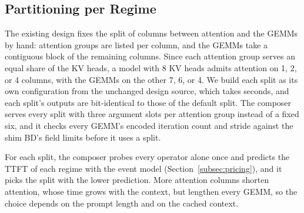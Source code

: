 \subsection{Partitioning per Regime}
\label{subsec:split}

The existing design fixes the split of columns between attention and the GEMMs by hand: attention groups are listed per column, and the GEMMs take a contiguous block of the remaining columns.
Since each attention group serves an equal share of the KV heads, a model with 8 KV heads admits attention on 1, 2, or 4 columns, with the GEMMs on the other 7, 6, or 4.
We build each split as its own configuration from the unchanged design source, which takes seconds, and each split's outputs are bit-identical to those of the default split.
The composer serves every split with three argument slots per attention group instead of a fixed six, and it checks every GEMM's encoded iteration count and stride against the shim BD's field limits before it uses a split.

For each split, the composer probes every operator alone once and predicts the TTFT of each regime with the event model (Section~\ref{subsec:pricing}), and it picks the split with the lower prediction.
More attention columns shorten attention, whose time grows with the context, but lengthen every GEMM, so the choice depends on the prompt length and on the cached context.

